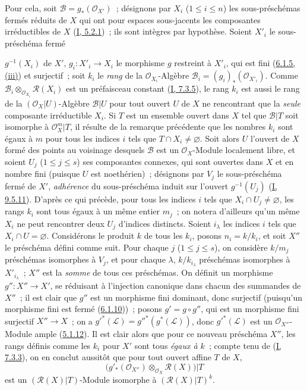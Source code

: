 Pour cela, soit $\mathcal{B}=g_*(\mathcal{O}_{X'})$~; désignons par $X_i$
($1\leq i\leq n$) les sous-préschémas fermés réduits de $X$ qui ont pour
espaces sous-jacents les composantes irréductibles de $X$
(\hyperref[I.5.2.1-fr]{I, 5.2.1})~; ils sont intègres par hypothèse. Soient
$X'_i$ le sous-préschéma fermé


$g^{-1}(X_i)$ de $X'$, $g_i:X'_i\to X_i$ le morphisme $g$ restreint à
$X'_i$, qui est fini (\hyperref[II.6.1.5-fr]{6.1.5, (iii)}) et surjectif~;
soit $k_i$ le \emph{rang} de la $\mathcal{O}_{X_i}$-Algèbre
$\mathcal{B}_i=(g_i)_*(\mathcal{O}_{X'_i})$. Comme
$\mathcal{B}_i\otimes_{\mathcal{O}_{X_i}}\mathcal{R}(X_i)$ est un
préfaisceau constant (\hyperref[I.7.3.5-fr]{I, 7.3.5}), le rang $k_i$ est
aussi le rang de la $(\mathcal{O}_X|U)$-Algèbre $\mathcal{B}|U$ pour tout
ouvert $U$ de $X$ ne rencontrant que la \emph{seule} composante irréductible
$X_i$. Si $T$ est un ensemble ouvert dans $X$ tel que $\mathcal{B}|T$ soit
isomorphe à $\mathcal{O}_X^m|T$, il résulte de la remarque précédente que les
nombres $k_i$ sont égaux à $m$ pour tous les indices $i$ tels que
$T\cap X_i\neq\varnothing$. Soit alors $U$ l'ouvert de $X$ formé des points
au voisinage desquels $\mathcal{B}$ est un $\mathcal{O}_X$-Module localement
libre, et soient $U_j$ ($1\leq j\leq s$) ses composantes connexes, qui sont
ouvertes dans $X$ et en nombre fini (puisque $U$ est noethérien)~; désignons
par $V_j$ le sous-préschéma fermé de $X'$, \emph{adhérence} du sous-préschéma
induit sur l'ouvert $g^{-1}(U_j)$
(\hyperref[I.9.5.11-fr]{I, 9.5.11}). D'après ce qui précède, pour tous les
indices $i$ tels que $X_i\cap U_j\neq\varnothing$, les rangs $k_i$ sont tous
égaux à un même entier $m_j$~; on notera d'ailleurs qu'un même $X_i$ ne peut
rencontrer deux $U_j$ d'indices distincts. Soient $i_\lambda$ les indices
$i$ tels que $X_i\cap U=\varnothing$. Considérons le produit $k$ de tous les
$k_i$, posons $n_i=k/k_i$, et soit $X''$ le préschéma défini comme suit.
Pour chaque $j$ ($1\leq j\leq s$), on considère $k/m_j$ préschémas
isomorphes à $V_j$, et pour chaque $\lambda$, $k/k_{i_\lambda}$ préschémas
isomorphes à $X'_{i_\lambda}$~; $X''$ est la \emph{somme} de tous ces
préschémas. On définit un morphisme $g'':X''\to X'$, se réduisant à
l'injection canonique dans chacun des summandes de $X''$~; il est clair que
$g''$ est un morphisme fini dominant, donc surjectif (puisqu'un morphisme
fini est fermé (\hyperref[II.6.1.10-fr]{6.1.10}))~; posons
$g'=g\circ g''$, qui est un morphisme fini surjectif $X''\to X$~; on a
${g'}^*(\mathcal{L})={g''}^*(g^*(\mathcal{L}))$, donc
${g'}^*(\mathcal{L})$ est un $\mathcal{O}_{X''}$-Module ample
(\hyperref[II.5.1.12-fr]{5.1.12}). Il est clair alors que pour ce nouveau
préschéma $X''$, les rangs définis comme les $k_i$ pour $X'$ sont tous
\emph{égaux à $k$}~; compte tenu de
(\hyperref[I.7.3.3-fr]{I, 7.3.3}), on en conclut aussitôt que pour tout ouvert
affine $T$ de $X$,
\[
\bigl(g'_*(\mathcal{O}_{X''})
\otimes_{\mathcal{O}_X}\mathcal{R}(X)\bigr)|T
\]
est un $(\mathcal{R}(X)|T)$-Module isomorphe à
$(\mathcal{R}(X)|T)^k$.


